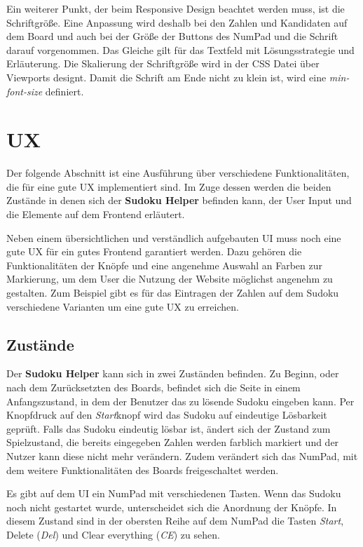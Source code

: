 Ein weiterer Punkt, der beim Responsive Design beachtet werden muss, ist die Schriftgröße. Eine Anpassung wird deshalb bei den Zahlen und Kandidaten auf dem Board und auch bei der Größe der Buttons des NumPad und die Schrift darauf vorgenommen. Das Gleiche gilt für das Textfeld mit Lösungsstrategie und Erläuterung. Die Skalierung der Schriftgröße wird in der \ac{CSS} Datei über Viewports designt. Damit die Schrift am Ende nicht zu klein ist, wird eine \textit{min-font-size} definiert. 


\section{\acl{UX}}
Der folgende Abschnitt ist eine Ausführung über verschiedene Funktionalitäten, die für eine gute \acl{UX} implementiert sind. Im Zuge dessen werden die beiden Zustände in denen sich der \textbf{Sudoku Helper} befinden kann, der User Input und die Elemente auf dem Frontend erläutert.

Neben einem übersichtlichen und verständlich aufgebauten \ac{UI} muss noch eine gute \ac{UX} für ein gutes Frontend garantiert werden. Dazu gehören die Funktionalitäten der Knöpfe und eine angenehme Auswahl an Farben zur Markierung, um dem User die Nutzung der Website möglichst angenehm zu gestalten. Zum Beispiel gibt es für das Eintragen der Zahlen auf dem Sudoku verschiedene Varianten um eine gute \ac{UX} zu erreichen. 

\subsection{Zustände}

Der \textbf{Sudoku Helper} kann sich in zwei Zuständen befinden. Zu Beginn, oder nach dem Zurücksetzten des Boards, befindet sich die Seite in einem Anfangszustand, in dem der Benutzer das zu lösende Sudoku eingeben kann. Per Knopfdruck auf den \textit{Start}knopf wird das Sudoku auf eindeutige Lösbarkeit geprüft. Falls das Sudoku eindeutig lösbar ist, ändert sich der Zustand zum \glqq Spielzustand\grqq, die bereits eingegeben Zahlen werden farblich markiert und der Nutzer kann diese nicht mehr verändern. Zudem verändert sich das NumPad, mit dem weitere Funktionalitäten des Boards freigeschaltet werden. 

Es gibt auf dem \ac{UI} ein NumPad mit verschiedenen Tasten. Wenn das Sudoku noch nicht gestartet wurde, unterscheidet sich die Anordnung der Knöpfe. In diesem Zustand sind in der obersten Reihe auf dem NumPad die Tasten \textit{Start}, Delete (\textit{Del}) und Clear everything (\textit{CE}) zu sehen. 

